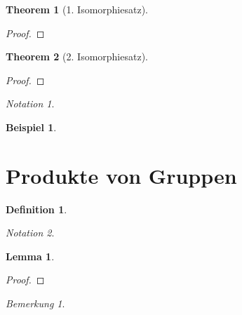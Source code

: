 \documentclass[12pt]{scrartcl}%
\newtheorem{thm}{Theorem}
\newtheorem{lemma}{Lemma}
\theoremstyle{definition}
\newtheorem*{defn}{Definition}
\newtheorem{ex}{Beispiel}
\theoremstyle{remark}
\newtheorem*{notation}{Notation}
\newtheorem*{nb}{Bemerkung}
\begin{document}
\begin{thm}[1. Isomorphiesatz]
	
\end{thm}

\begin{proof}
	
\end{proof}

\begin{thm}[2. Isomorphiesatz]
	
\end{thm}

\begin{proof}
	
\end{proof}

\begin{notation}
	
\end{notation}

\begin{ex}
	
\end{ex}



\section{Produkte von Gruppen}

\begin{defn}
	
\end{defn}

\begin{notation}
	
\end{notation}

\begin{lemma}
	
\end{lemma}

\begin{proof}
	
\end{proof}

\begin{nb}
	
\end{nb}
\end{document}
